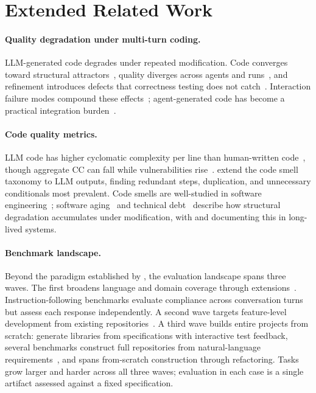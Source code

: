 \section{Extended Related Work}\label{sec:appendix-extended-related-work}

\paragraph{Quality degradation under multi-turn coding.} LLM-generated code degrades under repeated modification. Code converges toward structural attractors~\citep{iterative-readability}, quality diverges across agents and runs~\citep{chen2025-patch-quality, santos2025-software-aging, bohr2025-show-and-tell}, and refinement introduces defects that correctness testing does not catch~\citep{scaffold-cegis, diff-fuzzing-refactoring}. Interaction failure modes compound these effects~\citep{interaction-smells, overcorrection-reviewers, more-rounds-more-noise}; agent-generated code has become a practical integration burden~\citep{nakashima2026-agentic-prs, vibe-coding-overhead}.

\paragraph{Code quality metrics.} LLM code has higher cyclomatic complexity per line than human-written code~\citep{dou2024-whats-wrong-llm-code}, though aggregate CC can fall while vulnerabilities rise~\citep{cotroneo2025-human-vs-ai}. \citet{abbassi2025-taxonomy-inefficiencies} extend the code smell taxonomy to LLM outputs, finding redundant steps, duplication, and unnecessary conditionals most prevalent. Code smells are well-studied in software engineering~\citep{fowler1999-refactoring, lacerda2020-code-smells-tertiary}; software aging~\citep{parnas1994-software-aging} and technical debt~\citep{cunningham1992-technical-debt} describe how structural degradation accumulates under modification, with \citet{li2022-architecture-erosion} and \citet{le2021-architectural-decay} documenting this in long-lived systems.

\paragraph{Benchmark landscape.} Beyond the paradigm established by \citet{swe-bench}, the evaluation landscape spans three waves. The first broadens language and domain coverage through extensions~\citep{swe-bench-plus, multi-swe-bench, rust-swe-bench, swe-rebench-v2, swe-polybench}. Instruction-following benchmarks evaluate compliance across conversation turns~\citep{codeif-bench, multicodeif} but assess each response independently. A second wave targets feature-level development from existing repositories~\citep{fea-bench, featurebench}. A third wave builds entire projects from scratch: \citet{commit0} generate libraries from specifications with interactive test feedback, several benchmarks construct full repositories from natural-language requirements~\citep{projdevbench, e2edevbench, nl2repo-bench, swe-agi, projecteval}, and \citet{longcli-bench} spans from-scratch construction through refactoring. Tasks grow larger and harder across all three waves; evaluation in each case is a single artifact assessed against a fixed specification.
